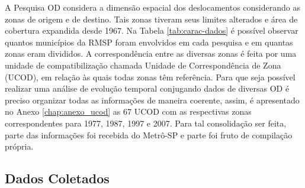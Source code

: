 A Pesquisa OD considera a dimensão espacial dos deslocamentos considerando as zonas de origem e de destino. Tais zonas tiveram seus limites alterados e área de cobertura expandida desde 1967. Na Tabela \ref{tab:carac-dados} é possível observar quantos municípios da RMSP foram envolvidos em cada pesquisa e em quantas zonas eram divididos. A correspondência entre as diversas zonas é feita por uma unidade de compatibilização chamada Unidade de Correspondência de Zona (UCOD), em relação às quais todas zonas têm referência. Para que seja possível realizar uma análise de evolução temporal conjugando dados de diversas OD é preciso organizar todas as informações de maneira coerente, assim, é apresentado no Anexo \ref{chap:anexo_ucod} as 67 UCOD  com as respectivas zonas correspondentes para 1977, 1987, 1997 e 2007. Para tal consolidação ser feita, parte das informações foi recebida do Metrô-SP e parte foi fruto de compilação própria.


\begin{table}[htb]
\end{table}


\subsection{Dados Coletados}\label{subsec:dados-coletados}


